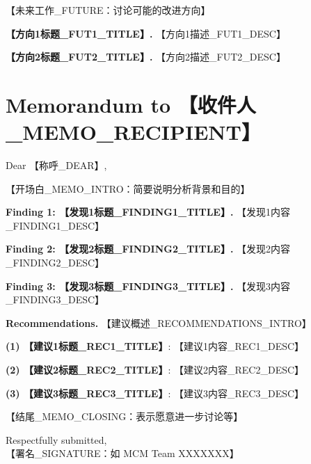 \documentclass{mcmthesis}
\begin{document}
【未来工作_FUTURE：讨论可能的改进方向】

\textbf{【方向1标题_FUT1_TITLE】.} 【方向1描述_FUT1_DESC】

\textbf{【方向2标题_FUT2_TITLE】.} 【方向2描述_FUT2_DESC】

\newpage
\thispagestyle{fancy}
\section{Memorandum to 【收件人_MEMO_RECIPIENT】}

\memodate{\today}
\raggedbottom

\begin{memo}[Memorandum]

Dear 【称呼_DEAR】,

【开场白_MEMO_INTRO：简要说明分析背景和目的】

\textbf{Finding 1: 【发现1标题_FINDING1_TITLE】.} 【发现1内容_FINDING1_DESC】

\textbf{Finding 2: 【发现2标题_FINDING2_TITLE】.} 【发现2内容_FINDING2_DESC】

\textbf{Finding 3: 【发现3标题_FINDING3_TITLE】.} 【发现3内容_FINDING3_DESC】

\textbf{Recommendations.} 【建议概述_RECOMMENDATIONS_INTRO】

\textbf{(1) 【建议1标题_REC1_TITLE】}: 【建议1内容_REC1_DESC】

\textbf{(2) 【建议2标题_REC2_TITLE】}: 【建议2内容_REC2_DESC】

\textbf{(3) 【建议3标题_REC3_TITLE】}: 【建议3内容_REC3_DESC】

【结尾_MEMO_CLOSING：表示愿意进一步讨论等】

\begin{flushright}
Respectfully submitted,\\
【署名_SIGNATURE：如 MCM Team XXXXXXX】
\end{flushright}

\end{memo}

\let\oldclearpage\clearpage
\let\clearpage\relax
\let\oldnewpage\newpage
\let\newpage\relax
\end{document}

